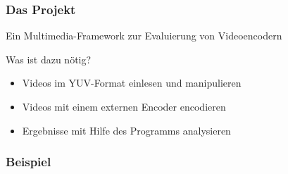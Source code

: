 \documentclass[t]{beamer}
\begin{document}
\begin{frame}
	\frametitle{Das Projekt}
	\begin{center}
		Ein Multimedia-Framework zur Evaluierung von Videoencodern	
	\end{center}
	 Was ist dazu nötig? \newline
	\begin{itemize}
		\item<1-> Videos im YUV-Format einlesen und manipulieren
		\item<2-> Videos mit einem externen Encoder encodieren
		\item<3-> Ergebnisse mit Hilfe des Programms analysieren
	\end{itemize}
\end{frame}

\begin{frame}
	\frametitle{Beispiel}


\end{frame}
\end{document}
